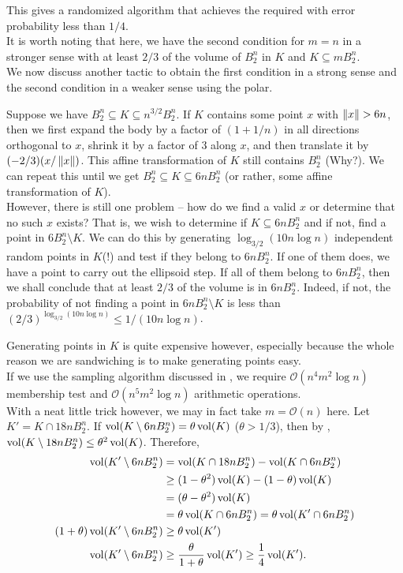 This gives a randomized algorithm that achieves the required with error probability less than $1/4$.\\
It is worth noting that here, we have the second condition for $m=n$ in a stronger sense with at least $2/3$ of the volume of $B_2^n$ in $K$ and $K\subseteq m B_2^n$.\\

We now discuss another tactic to obtain the first condition in a strong sense and the second condition in a weaker sense using the polar.

Suppose we have $B_2^n\subseteq K\subseteq n^{3/2}B_2^n$. If $K$ contains some point $x$ with $\left\lVert x\right\rVert>6n$, then we first expand the body by a factor of $(1+1/n)$ in all directions orthogonal to $x$, shrink it by a factor of $3$ along $x$, and then translate it by $(-2/3)(x/\left\lVert x\right\rVert)$. This affine transformation of $K$ still contains $B_2^n$ (Why?). We can repeat this until we get $B_2^n\subseteq K\subseteq 6nB_2^n$ (or rather, some affine transformation of $K$).\\

However, there is still one problem -- how do we find a valid $x$ or determine that no such $x$ exists? That is, we wish to determine if $K\subseteq 6nB_2^n$ and if not, find a point in $6B_2^n\setminus K$. We can do this by generating $\log_{3/2} (10n\log n)$ independent random points in $K$(!) and test if they belong to $6nB_2^n$. If one of them does, we have a point to carry out the ellipsoid step. If all of them belong to $6nB_2^n$, then we shall conclude that at least $2/3$ of the volume is in $6nB_2^n$. Indeed, if not, the probability of not finding a point in $6nB_2^n\setminus K$ is less than $(2/3)^{\log_{3/2} (10n\log n)} \leq 1/(10n\log n)$.

Generating points in $K$ is quite expensive however, especially because the whole reason we are sandwiching is to make generating points easy.\\
If we use the sampling algorithm discussed in , we require $\mathcal{O}(n^4 m^2 \log n)$ membership test and $\mathcal{O}(n^5 m^2 \log n)$ arithmetic operations.\\
With a neat little trick however, we may in fact take $m=\mathcal{O}(n)$ here. Let $K'=K\cap 18n B_2^n$. If $\operatorname{vol}(K\setminus 6nB_2^n)=\theta\operatorname{vol}(K)$ ($\theta>1/3$), then by , $\operatorname{vol}(K\setminus 18nB_2^n)\leq\theta^2\operatorname{vol}(K)$. Therefore,
\begin{align*}
	\operatorname{vol}(K'\setminus 6nB_2^n) &= \operatorname{vol}(K\cap 18nB_2^n) - \operatorname{vol}(K\cap 6nB_2^n) \\
		&\geq (1-\theta^2)\operatorname{vol}(K) - (1-\theta)\operatorname{vol}(K) \\
		&= (\theta-\theta^2)\operatorname{vol}(K) \\
		&= \theta\operatorname{vol}(K\cap 6nB_2^n) = \theta\operatorname{vol}(K'\cap 6nB_2^n) \\
	(1+\theta)\operatorname{vol}(K'\setminus 6nB_2^n) &\geq \theta\operatorname{vol}(K') \\
	\operatorname{vol}(K'\setminus 6nB_2^n) &\geq \frac{\theta}{1+\theta} \operatorname{vol}(K') \geq \frac{1}{4} \operatorname{vol}(K').
\end{align*}

